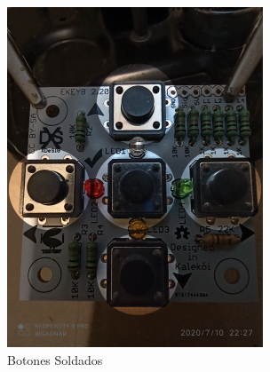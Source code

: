 \documentclass{article}
\begin{document}
\begin{figure}[H]
    \centering
    \begin{subfigure}[t]{0.3\textwidth}
        \centering
        \includegraphics[width=0.9\columnwidth, height=1.2\columnwidth]{images/Botonera/botones1.png}
        \caption{Botones Soldados}
        \label{fig:botones_frente}
    \end{subfigure}%
    \begin{subfigure}[t]{0.3\textwidth}
        \centering

\end{subfigure}
\end{figure}
\end{document}
